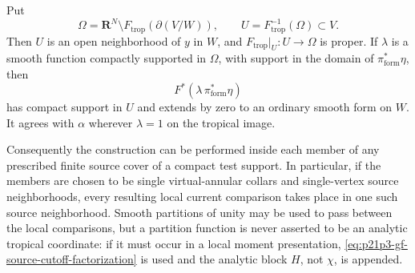 \begin{lemma}
Put
\begin{equation}
 \Omega=\mathbf R^N\setminus
       F_{\mathrm{trop}}(\partial(V/W)),
 \qquad U=F_{\mathrm{trop}}^{-1}(\Omega)\subset V.
 \label{eq:p21p3-gf-source-local-omega}
\end{equation}
Then \(U\) is an open neighborhood of \(y\) in \(W\), and
\(F_{\mathrm{trop}}|_U:U\to\Omega\) is proper.  If \(\lambda\) is a smooth
function compactly supported in \(\Omega\), with support in the domain of
\(\pi_{\mathrm{form}}^*\eta\), then
\[
 F^*(\lambda\,\pi_{\mathrm{form}}^*\eta)
\]
has compact support in \(U\) and extends by zero to an ordinary smooth form
on \(W\).  It agrees with \(\alpha\) wherever \(\lambda=1\) on the tropical
image.

Consequently the construction can be performed inside each member of any
prescribed finite source cover of a compact test support.  In particular, if
the members are chosen to be single virtual-annular collars and
single-vertex source neighborhoods, every resulting local current comparison
takes place in one such source neighborhood.  Smooth partitions of unity may
be used to pass between the local comparisons, but a partition function is
never asserted to be an analytic tropical coordinate: if it must occur in a
local moment presentation, \eqref{eq:p21p3-gf-source-cutoff-factorization}
is used and the analytic block \(H\), not \(\chi\), is appended.
\end{lemma}

